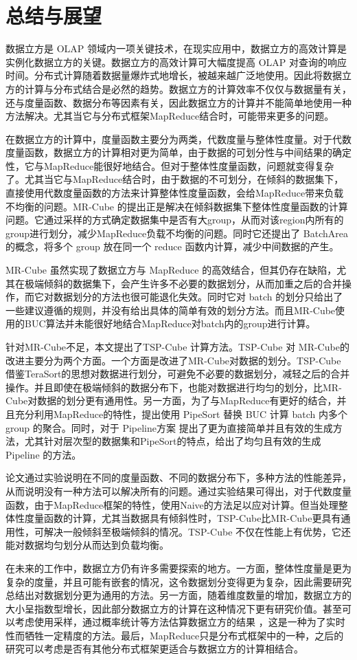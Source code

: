 
\chapter{总结与展望}

数据立方是 OLAP 领域内一项关键技术，在现实应用中，数据立方的高效计算是实例化数据立方的关键。数据立方的高效计算可大幅度提高 OLAP 对查询的响应时间。分布式计算随着数据量爆炸式地增长，被越来越广泛地使用。因此将数据立方的计算与分布式结合是必然的趋势。数据立方的计算效率不仅仅与数据量有关，还与度量函数、数据分布等因素有关，因此数据立方的计算并不能简单地使用一种方法解决。尤其当它与分布式框架MapReduce结合时，可能带来更多的问题。

在数据立方的计算中，度量函数主要分为两类，代数度量与整体性度量。对于代数度量函数，数据立方的计算相对更为简单，由于数据的可划分性与中间结果的确定性，它与MapReduce能很好地结合。但对于整体性度量函数，问题就变得复杂了。尤其当它与MapReduce结合时，由于数据的不可划分，在倾斜的数据集下，直接使用代数度量函数的方法来计算整体性度量函数，会给MapReduce带来负载不均衡的问题。MR-Cube 的提出正是解决在倾斜数据集下整体性度量函数的计算问题。它通过采样的方式确定数据集中是否有大group，从而对该region内所有的group进行划分，减少MapReduce负载不均衡的问题。同时它还提出了 BatchArea 的概念，将多个 group 放在同一个 reduce 函数内计算，减少中间数据的产生。

MR-Cube 虽然实现了数据立方与 MapReduce 的高效结合，但其仍存在缺陷，尤其在极端倾斜的数据集下，会产生许多不必要的数据划分，从而加重之后的合并操作，而它对数据划分的方法也很可能退化失效。同时它对 batch 的划分只给出了一些建议遵循的规则，并没有给出具体的简单有效的划分方法。而且MR-Cube使用的BUC算法并未能很好地结合MapReduce对batch内的group进行计算。

针对MR-Cube不足，本文提出了TSP-Cube 计算方法。TSP-Cube 对 MR-Cube的改进主要分为两个方面。一个方面是改进了MR-Cube对数据的划分。TSP-Cube 借鉴TeraSort的思想对数据进行划分，可避免不必要的数据划分，减轻之后的合并操作。并且即使在极端倾斜的数据分布下，也能对数据进行均匀的划分，比MR-Cube对数据的划分更有通用性。另一方面，为了与MapReduce有更好的结合，并且充分利用MapReduce的特性，提出使用 PipeSort 替换 BUC 计算 batch 内多个 group 的聚合。同时，对于 Pipeline方案 提出了更为直接简单并且有效的生成方法，尤其针对层次型的数据集和PipeSort的特点，给出了均匀且有效的生成 Pipeline 的方法。

论文通过实验说明在不同的度量函数、不同的数据分布下，多种方法的性能差异，从而说明没有一种方法可以解决所有的问题。通过实验结果可得出，对于代数度量函数，由于MapReduce框架的特性，使用Naive的方法足以应对计算。但当处理整体性度量函数的计算，尤其当数据具有倾斜性时，TSP-Cube比MR-Cube更具有通用性，可解决一般倾斜至极端倾斜的情况。TSP-Cube 不仅在性能上有优势，它还能对数据均匀划分从而达到负载均衡。

在未来的工作中，数据立方仍有许多需要探索的地方。一方面，整体性度量是更为复杂的度量，并且可能有嵌套的情况，这令数据划分变得更为复杂，因此需要研究总结出对数据划分更为通用的方法。另一方面，随着维度数量的增加，数据立方的大小呈指数型增长，因此部分数据立方的计算在这种情况下更有研究价值。甚至可以考虑使用采样，通过概率统计等方法估算数据立方的结果 \cite{kamatdistributed}，这是一种为了实时性而牺牲一定精度的方法。最后，MapReduce只是分布式框架中的一种，之后的研究可以考虑是否有其他分布式框架更适合与数据立方的计算相结合。
